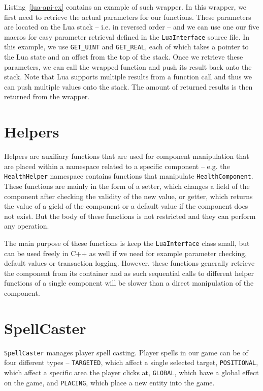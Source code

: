 Listing~\ref{lua-api-ex} contains an example of such wrapper. In this wrapper, we first need to retrieve the actual parameters for our
functions. These parameters are located on the Lua stack -- i.e. in reversed order -- and we can use one our five macros for easy
parameter retrieval defined in the \texttt{LuaInterface} source file. In this example, we use \texttt{GET\_UINT} and \texttt{GET\_REAL},
each of which takes a pointer to the Lua state and an offset from the top of the stack. Once we retrieve these parameters, we can call the
wrapped function and push its result back onto the stack. Note that Lua supports multiple results from a function call and thus we can
push multiple values onto the stack. The amount of returned results is then returned from the wrapper.

\section{Helpers}

Helpers are auxiliary functions that are used for component manipulation that are placed within a namespace related to a specific component
-- e.g. the \texttt{HealthHelper} namespace contains functions that manipulate \texttt{HealthComponent}. These functions are mainly in the
form of a setter, which changes a field of the component after checking the validity of the new value, or getter, which returns the value
of a gield of the component or a default value if the component does not exist. But the body of these functions is not restricted and they
can perform any operation.

The main purpose of these functions is keep the \texttt{LuaInterface} class small, but can be used freely in C++ as well if we need for
example parameter checking, default values or transaction logging. However, these functions generally retrieve the component from its
container and as such sequential calls to different helper functions of a single component will be slower than a direct manipulation
of the component.

\section{SpellCaster}

\texttt{SpellCaster} manages player spell casting. Player spells in our game can be of four different types -- \texttt{TARGETED}, which
affect a single selected target, \texttt{POSITIONAL}, which affect a specific area the player clicks at, \texttt{GLOBAL}, which have a
global effect on the game, and \texttt{PLACING}, which place a new entity into the game.

